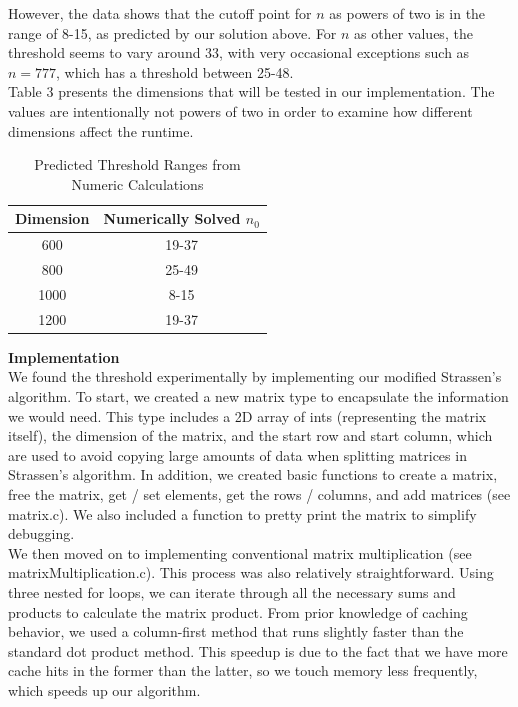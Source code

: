 \documentclass[12pt]{article}
\begin{document}
However, the data shows that the cutoff point for $n$ as powers of two is in the range of 8-15, as predicted by our solution above. For $n$ as other values, the threshold seems to vary around 33, with very occasional exceptions such as $n = 777$, which has a threshold between 25-48.\\

Table 3 presents the dimensions that will be tested in our implementation. The values are intentionally not powers of two in order to examine how different dimensions affect the runtime.

\begin{table}[h]
\centering
{\setlength{\tabcolsep}{15pt}
\begin{tabular}{c|c}
Dimension & Numerically Solved $n_0$ \\\hline
600 & 19-37 \\
800 & 25-49 \\
1000 & 8-15 \\
1200 & 19-37 \\
\end{tabular}}
\caption{Predicted Threshold Ranges from Numeric Calculations}
\end{table}

\bigskip

\textbf{Implementation} \\
We found the threshold experimentally by implementing our modified Strassen's algorithm. To start, we created a new matrix type to encapsulate the information we would need. This type includes a 2D array of ints (representing the matrix itself), the dimension of the matrix, and the start row and start column, which are used to avoid copying large amounts of data when splitting matrices in Strassen's algorithm. In addition, we created basic functions to create a matrix, free the matrix, get / set elements, get the rows / columns, and add matrices (see matrix.c). We also included a function to pretty print the matrix to simplify debugging. \\

We then moved on to implementing conventional matrix multiplication (see matrixMultiplication.c). This process was also relatively straightforward. Using three nested for loops, we can iterate through all the necessary sums and products to calculate the matrix product. From prior knowledge of caching behavior, we used a column-first method that runs slightly faster than the standard dot product method. This speedup is due to the fact that we have more cache hits in the former than the latter, so we touch memory less frequently, which speeds up our algorithm. \\
\end{document}
